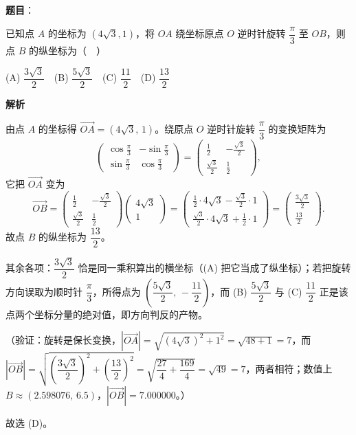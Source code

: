 \begin{answer}

\textbf{题目}：

已知点 \(A\) 的坐标为 \((4\sqrt{3},1)\)，将 \(OA\) 绕坐标原点 \(O\) 逆时针旋转 \(\dfrac{\pi}{3}\) 至 \(OB\)，则点 \(B\) 的纵坐标为（　）

(A) \(\dfrac{3\sqrt{3}}{2}\)　(B) \(\dfrac{5\sqrt{3}}{2}\)　(C) \(\dfrac{11}{2}\)　(D) \(\dfrac{13}{2}\)

\textbf{解析}

由点 \(A\) 的坐标得 \(\overrightarrow{OA}=(4\sqrt{3},\,1)\)。绕原点 \(O\) 逆时针旋转 \(\dfrac{\pi}{3}\) 的变换矩阵为
\nopagebreak[4]
\[
\begin{pmatrix}\cos\frac{\pi}{3} & -\sin\frac{\pi}{3}\\ \sin\frac{\pi}{3} & \cos\frac{\pi}{3}\end{pmatrix}=\begin{pmatrix}\frac{1}{2} & -\frac{\sqrt{3}}{2}\\ \frac{\sqrt{3}}{2} & \frac{1}{2}\end{pmatrix},
\]
它把 \(\overrightarrow{OA}\) 变为
\nopagebreak[4]
\[
\overrightarrow{OB}=\begin{pmatrix}\frac{1}{2} & -\frac{\sqrt{3}}{2}\\ \frac{\sqrt{3}}{2} & \frac{1}{2}\end{pmatrix}\begin{pmatrix}4\sqrt{3}\\ 1\end{pmatrix}=\begin{pmatrix}\frac{1}{2}\cdot4\sqrt{3}-\frac{\sqrt{3}}{2}\cdot1\\ \frac{\sqrt{3}}{2}\cdot4\sqrt{3}+\frac{1}{2}\cdot1\end{pmatrix}=\begin{pmatrix}\frac{3\sqrt{3}}{2}\\ \frac{13}{2}\end{pmatrix}.
\]
故点 \(B\) 的纵坐标为 \(\dfrac{13}{2}\)。

其余各项：\(\dfrac{3\sqrt{3}}{2}\) 恰是同一乘积算出的横坐标（(A) 把它当成了纵坐标）；若把旋转方向误取为顺时针 \(\dfrac{\pi}{3}\)，所得点为 \(\left(\dfrac{5\sqrt{3}}{2},\,-\dfrac{11}{2}\right)\)，而 (B) \(\dfrac{5\sqrt{3}}{2}\) 与 (C) \(\dfrac{11}{2}\) 正是该点两个坐标分量的绝对值，即方向判反的产物。

（验证：旋转是保长变换，\(\left|\overrightarrow{OA}\right|=\sqrt{(4\sqrt{3})^{2}+1^{2}}=\sqrt{48+1}=7\)，而 \(\left|\overrightarrow{OB}\right|=\sqrt{\left(\dfrac{3\sqrt{3}}{2}\right)^{2}+\left(\dfrac{13}{2}\right)^{2}}=\sqrt{\dfrac{27}{4}+\dfrac{169}{4}}=\sqrt{49}=7\)，两者相符；数值上 \(B\approx(2.598076,\,6.5)\)，\(\left|\overrightarrow{OB}\right|=7.000000\)。）

故选 (D)。


\end{answer}
